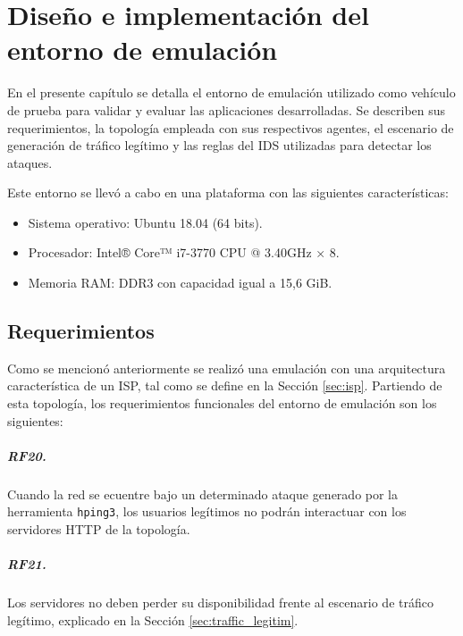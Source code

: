 \chapter{Diseño e implementación del entorno de emulación}
\label{Chapter7} %

En el presente capítulo se detalla el entorno de emulación utilizado como
vehículo de prueba para validar y evaluar las aplicaciones desarrolladas. Se
describen sus requerimientos, la topología empleada con sus respectivos agentes,
el escenario de generación de tráfico legítimo y las reglas del IDS utilizadas
para detectar los ataques.

Este entorno se llevó a cabo en una plataforma con las siguientes
características:

\begin{itemize}
	\item{Sistema operativo:} Ubuntu 18.04 (64 bits).
	\item{Procesador:} Intel® Core™ i7-3770 CPU @ 3.40GHz × 8.
	\item{Memoria RAM:} DDR3 con capacidad igual a 15,6 GiB.
\end{itemize}


\section {Requerimientos}

Como se mencionó anteriormente se realizó una emulación con una arquitectura
característica de un ISP, tal como se define en la Sección \ref{sec:isp}.
Partiendo de esta topología, los requerimientos funcionales del entorno de
emulación son los siguientes:

\paragraph{RF20.} Cuando la red se ecuentre bajo un determinado ataque generado por la herramienta \verb|hping3|, los usuarios legítimos no podrán interactuar con los servidores HTTP de la topología.

\paragraph{RF21.} Los servidores no deben perder su disponibilidad frente al
escenario de tráfico legítimo, explicado en la Sección
\ref{sec:traffic_legitim}.

